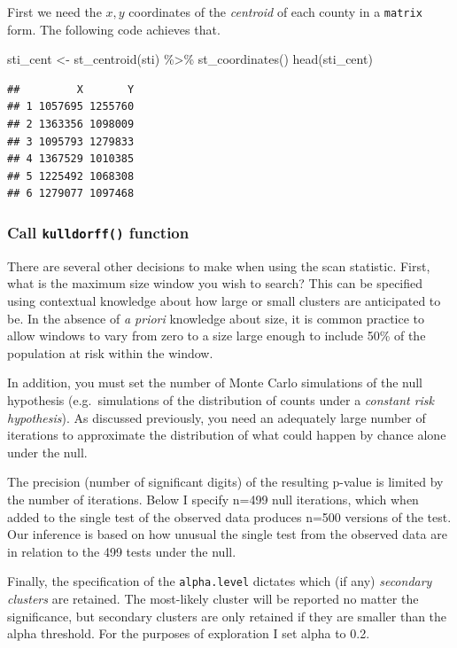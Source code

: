\documentclass[
]{book}
\newenvironment{Shaded}{\begin{snugshade}}{\end{snugshade}}
\newcommand{\FunctionTok}[1]{\textcolor[rgb]{0.00,0.00,0.00}{#1}}
\newcommand{\NormalTok}[1]{#1}
\newcommand{\OtherTok}[1]{\textcolor[rgb]{0.56,0.35,0.01}{#1}}
\newcommand{\SpecialCharTok}[1]{\textcolor[rgb]{0.00,0.00,0.00}{#1}}
\begin{document}
First we need the \(x,y\) coordinates of the \emph{centroid} of each county in a \texttt{matrix} form. The following code achieves that.

\begin{Shaded}
\begin{Highlighting}[]
\NormalTok{sti\_cent }\OtherTok{\textless{}{-}} \FunctionTok{st\_centroid}\NormalTok{(sti) }\SpecialCharTok{\%\textgreater{}\%}
  \FunctionTok{st\_coordinates}\NormalTok{()}
\FunctionTok{head}\NormalTok{(sti\_cent)}
\end{Highlighting}
\end{Shaded}

\begin{verbatim}
##         X       Y
## 1 1057695 1255760
## 2 1363356 1098009
## 3 1095793 1279833
## 4 1367529 1010385
## 5 1225492 1068308
## 6 1279077 1097468
\end{verbatim}

\hypertarget{call-kulldorff-function}{%
\subsubsection{\texorpdfstring{Call \texttt{kulldorff()} function}{Call kulldorff() function}}\label{call-kulldorff-function}}

There are several other decisions to make when using the scan statistic. First, what is the maximum size window you wish to search? This can be specified using contextual knowledge about how large or small clusters are anticipated to be. In the absence of \emph{a priori} knowledge about size, it is common practice to allow windows to vary from zero to a size large enough to include 50\% of the population at risk within the window.

In addition, you must set the number of Monte Carlo simulations of the null hypothesis (e.g.~simulations of the distribution of counts under a \emph{constant risk hypothesis}). As discussed previously, you need an adequately large number of iterations to approximate the distribution of what could happen by chance alone under the null.

The precision (number of significant digits) of the resulting p-value is limited by the number of iterations. Below I specify n=499 null iterations, which when added to the single test of the observed data produces n=500 versions of the test. Our inference is based on how unusual the single test from the observed data are in relation to the 499 tests under the null.

Finally, the specification of the \texttt{alpha.level} dictates which (if any) \emph{secondary clusters} are retained. The most-likely cluster will be reported no matter the significance, but secondary clusters are only retained if they are smaller than the alpha threshold. For the purposes of exploration I set alpha to 0.2.
\end{document}
